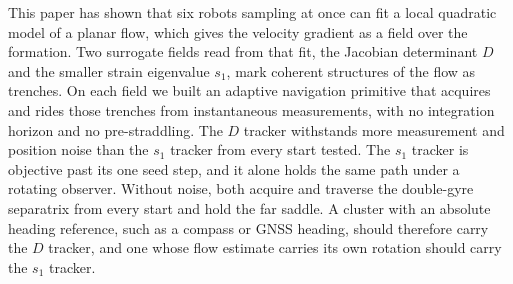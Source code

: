 \documentclass[lettersize,journal]{IEEEtran}
\begin{document}
This paper has shown that six robots sampling at once can fit a local
quadratic model of a planar flow, which gives the velocity gradient as a
field over the formation. Two surrogate fields read from that fit, the
Jacobian determinant $D$ and the smaller strain eigenvalue $s_1$, mark
coherent structures of the flow as trenches. On each field we built an
adaptive navigation primitive that acquires and rides those trenches from
instantaneous measurements, with no integration horizon and no
pre-straddling. The $D$ tracker withstands more measurement and position
noise than the $s_1$ tracker from every start tested. The $s_1$ tracker is
objective past its one seed step, and it alone holds the same path under a
rotating observer. Without noise, both acquire and traverse the
double-gyre separatrix from every start and hold the far saddle.
A cluster with an absolute heading reference, such as a compass or GNSS
heading, should therefore carry the $D$ tracker, and one whose flow
estimate carries its own rotation should carry the $s_1$ tracker.
\end{document}
